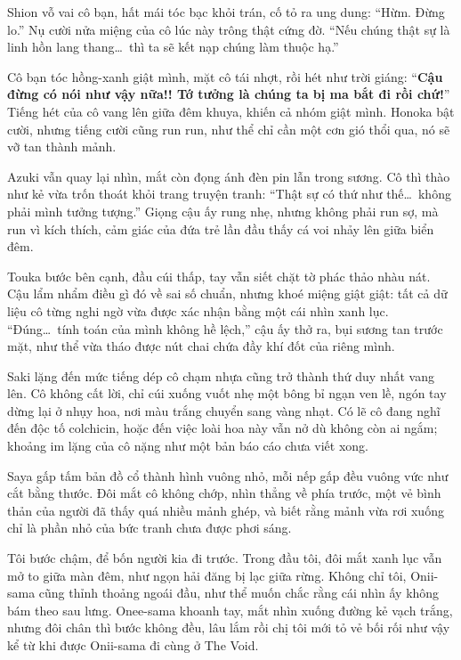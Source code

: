 \documentclass[../main.tex]{subfiles}
\begin{document}
Shion vỗ vai cô bạn, hất mái tóc bạc khỏi trán, cố tỏ ra ung dung: ``Hừm. Đừng lo.'' Nụ cười nửa miệng của cô lúc này trông thật cứng đờ. ``Nếu chúng thật sự là linh hồn lang thang\dots\ thì ta sẽ kết nạp chúng làm thuộc hạ.''

Cô bạn tóc hồng-xanh giật mình, mặt cô tái nhợt, rồi hét như trời giáng: ``\textbf{Cậu đừng có nói như vậy nữa!! Tớ tưởng là chúng ta bị ma bắt đi rồi chứ!}'' Tiếng hét của cô vang lên giữa đêm khuya, khiến cả nhóm giật mình. Honoka bật cười, nhưng tiếng cười cũng run run, như thể chỉ cần một cơn gió thổi qua, nó sẽ vỡ tan thành mảnh.

Azuki vẫn quay lại nhìn, mắt còn đọng ánh đèn pin lẫn trong sương. Cô thì thào như kẻ vừa trốn thoát khỏi trang truyện tranh: ``Thật sự có thứ như thế\dots\ không phải mình tưởng tượng.'' Giọng cậu ấy rung nhẹ, nhưng không phải run sợ, mà run vì kích thích, cảm giác của đứa trẻ lần đầu thấy cá voi nhảy lên giữa biển đêm.

Touka bước bên cạnh, đầu cúi thấp, tay vẫn siết chặt tờ phác thảo nhàu nát. Cậu lẩm nhẩm điều gì đó về sai số chuẩn, nhưng khoé miệng giật giật: tất cả dữ liệu cô từng nghi ngờ vừa được xác nhận bằng một cái nhìn xanh lục. ``Đúng\dots\ tính toán của mình không hề lệch,'' cậu ấy thở ra, bụi sương tan trước mặt, như thể vừa tháo được nút chai chứa đầy khí đốt của riêng mình.

Saki lặng đến mức tiếng dép cô chạm nhựa cũng trở thành thứ duy nhất vang lên. Cô không cất lời, chỉ cúi xuống vuốt nhẹ một bông bỉ ngạn ven lề, ngón tay dừng lại ở nhụy hoa, nơi màu trắng chuyển sang vàng nhạt. Có lẽ cô đang nghĩ đến độc tố colchicin, hoặc đến việc loài hoa này vẫn nở dù không còn ai ngắm; khoảng im lặng của cô nặng như một bản báo cáo chưa viết xong.

Saya gấp tấm bản đồ cổ thành hình vuông nhỏ, mỗi nếp gấp đều vuông vức như cắt bằng thước. Đôi mắt cô không chớp, nhìn thẳng về phía trước, một vẻ bình thản của người đã thấy quá nhiều mảnh ghép, và biết rằng mảnh vừa rơi xuống chỉ là phần nhỏ của bức tranh chưa được phơi sáng.

Tôi bước chậm, để bốn người kia đi trước. Trong đầu tôi, đôi mắt xanh lục vẫn mở to giữa màn đêm, như ngọn hải đăng bị lạc giữa rừng. Không chỉ tôi, Onii-sama cũng thỉnh thoảng ngoái đầu, như thể muốn chắc rằng cái nhìn ấy không bám theo sau lưng. Onee-sama khoanh tay, mắt nhìn xuống đường kẻ vạch trắng, nhưng đôi chân thì bước không đều, lâu lắm rồi chị tôi mới tỏ vẻ bối rối như vậy kể từ khi được Onii-sama đi cùng ở The Void.
\end{document}
